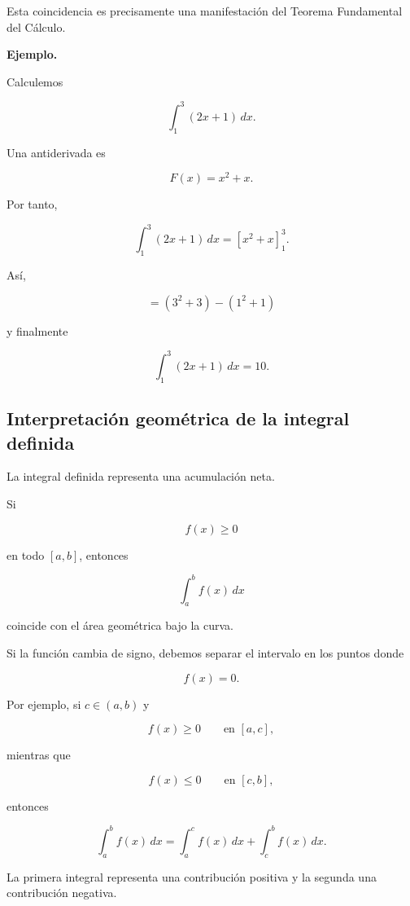 \documentclass[12pt]{article}
\newenvironment{Ejem}
{\par\medskip\noindent\textbf{Ejemplo.}\ }
{\par\medskip}
\begin{document}
Esta coincidencia es precisamente una manifestación del Teorema
Fundamental del Cálculo.


\begin{Ejem}

Calculemos

\[
\int_1^3(2x+1)\,dx.
\]

Una antiderivada es

\[
F(x)=x^2+x.
\]

Por tanto,

\[
\int_1^3(2x+1)\,dx
=
\left[x^2+x\right]_1^3.
\]

Así,

\[
=
(3^2+3)-(1^2+1)
\]

y finalmente

\[
\boxed{
\int_1^3(2x+1)\,dx=10.
}
\]

\end{Ejem}

\subsection{Interpretación geométrica de la integral definida}

La integral definida representa una acumulación neta.

Si

\[
f(x)\geq0
\]

en todo $[a,b]$, entonces

\[
\int_a^b f(x)\,dx
\]

coincide con el área geométrica bajo la curva.

Si la función cambia de signo, debemos separar el intervalo en los puntos
donde

\[
f(x)=0.
\]

Por ejemplo, si $c\in(a,b)$ y

\[
f(x)\geq0
\qquad\text{en }[a,c],
\]

mientras que

\[
f(x)\leq0
\qquad\text{en }[c,b],
\]

entonces

\[
\int_a^b f(x)\,dx
=
\int_a^c f(x)\,dx
+
\int_c^b f(x)\,dx.
\]

La primera integral representa una contribución positiva y la segunda una
contribución negativa.
\end{document}
